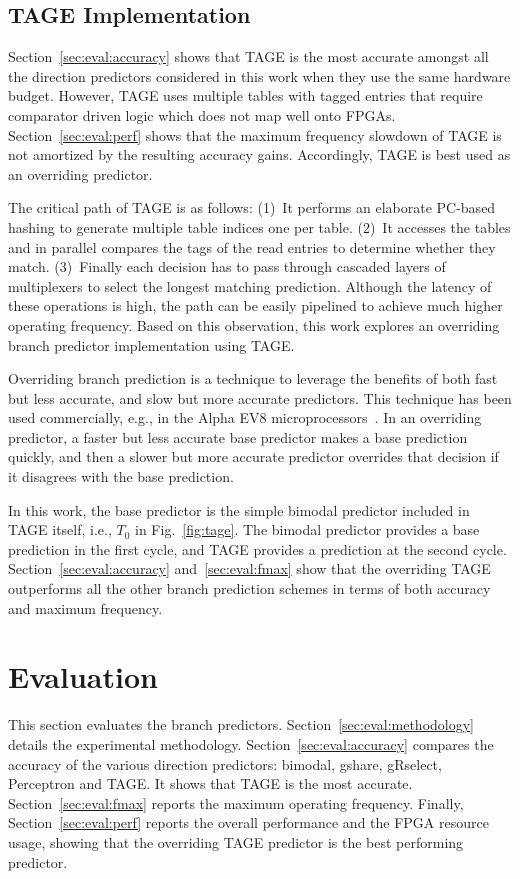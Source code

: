 \documentclass[conference]{IEEEtran}
\begin{document}
\subsection{TAGE Implementation}
\label{sec:fpga:tage}
Section~\ref{sec:eval:accuracy} shows that TAGE  is the most accurate amongst all the direction predictors considered in this work when they use the same hardware budget. However, TAGE uses multiple tables with tagged entries that require comparator driven logic which does not map well onto FPGAs. Section~\ref{sec:eval:perf} shows that the maximum frequency slowdown of TAGE is not amortized by the resulting accuracy gains. Accordingly, TAGE is best used as an overriding predictor.

The critical path of TAGE is as follows: (1)~It performs an elaborate PC-based hashing to generate multiple table indices one per table. (2)~It accesses the tables and in parallel compares the tags of the read entries to determine whether they match. (3)~Finally each decision has to pass through cascaded layers of multiplexers to select the longest matching prediction. Although the latency of these operations is high, the path can be easily pipelined to achieve much higher operating frequency. Based on this observation, this work explores an overriding branch predictor implementation using TAGE.

Overriding branch prediction is a technique to leverage the benefits of both fast but less accurate, and slow but more accurate predictors. This technique has been used commercially, e.g., in the Alpha EV8 microprocessors~\cite{alphaEV8}. In an overriding predictor, a faster but less accurate base predictor makes a base prediction quickly, and then a slower but more accurate predictor overrides that decision if it disagrees with the base prediction. 

In this work, the base predictor is the simple bimodal predictor included in TAGE itself, i.e., $T_0$ in Fig.~\ref{fig:tage}. The bimodal predictor provides a base prediction in the first cycle, and TAGE provides a prediction at the second cycle. Section~\ref{sec:eval:accuracy} and~\ref{sec:eval:fmax} show that the overriding TAGE outperforms all the other branch prediction schemes in terms of both accuracy and maximum frequency.

\section{Evaluation}
\label{sec:eval}
This section evaluates the branch predictors. Section~\ref{sec:eval:methodology} details the experimental methodology. Section~\ref{sec:eval:accuracy} compares the accuracy of the various direction predictors: bimodal, gshare, gRselect, Perceptron and TAGE. It shows that TAGE is the most accurate. Section~\ref{sec:eval:fmax} reports the maximum operating frequency. Finally, Section~\ref{sec:eval:perf} reports the overall performance and the FPGA resource usage, showing that the overriding TAGE predictor is the best performing predictor.
\end{document}
